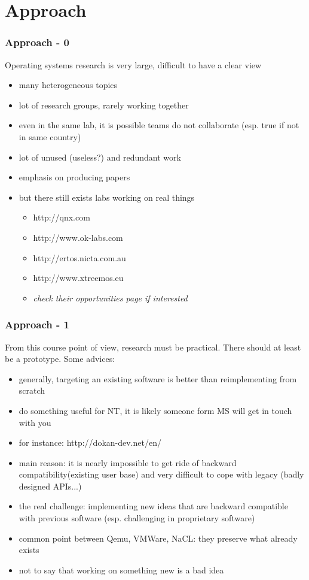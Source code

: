 \section{Approach}

\begin{frame}
  \frametitle{Approach - 0}
  Operating systems research is very large, difficult to have a clear view

  \begin{itemize}
    \item
      many heterogeneous topics
    \item
      lot of research groups, rarely working together
    \item
      even in the same lab, it is possible teams do not collaborate (esp. true if not in same country)
    \item
      lot of unused (useless?) and redundant work
    \item
      emphasis on producing papers
    \item
      but there still exists labs working on real things
      \begin{itemize}
	\item
	  http://qnx.com
	\item
          http://www.ok-labs.com
        \item
	  http://ertos.nicta.com.au
        \item
	  http://www.xtreemos.eu
	\item
	  \textit{check their opportunities page if interested}
      \end{itemize}
  \end{itemize}
\end{frame}

\begin{frame}
  \frametitle{Approach - 1}
  From this course point of view, research must be practical.
  There should at least be a prototype. Some advices:
  \begin{itemize}
    \item
      generally, targeting an existing software is better than reimplementing from scratch
    \item
      do something useful for NT, it is likely someone form MS will get in touch with you
    \item
      for instance: http://dokan-dev.net/en/
    \item
      main reason: it is nearly impossible to get ride of backward compatibility(existing user base) and very difficult to cope with legacy (badly designed APIs...)
    \item
      the real challenge: implementing new ideas that are backward compatible
      with previous software (esp. challenging in proprietary software)
    \item
      common point between Qemu, VMWare, NaCL: they preserve what already exists
    \item
      not to say that working on something new is a bad idea
  \end{itemize}
\end{frame}

